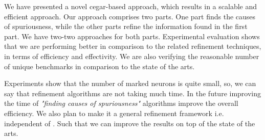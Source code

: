 We have presented a novel cegar-based approach, which results in a scalable and efficient approach. 
Our approach comprises two parts. One part finds the causes of spuriousness, while the other parts refine 
the information found in the first part. We have two-two approaches for both parts. 
Experimental evaluation shows that we are performing better in comparison to the related refinement techniques, 
in terms of efficiency and effectivity. We are also verifying the reasonable number of unique benchmarks
in comparison to the state of the arts. 

Experiments show that the number of marked neurons is quite small, so, 
we can say that refinement algorithms are not taking much time.
In the future improving the time of {\em "finding causes of spuriousness"} algorithms improve the overall efficiency.    
We also plan to make it a general refinement framework i.e. independent of \deeppoly{}. Such that 
we can improve the results on top of the state of the arts.  
